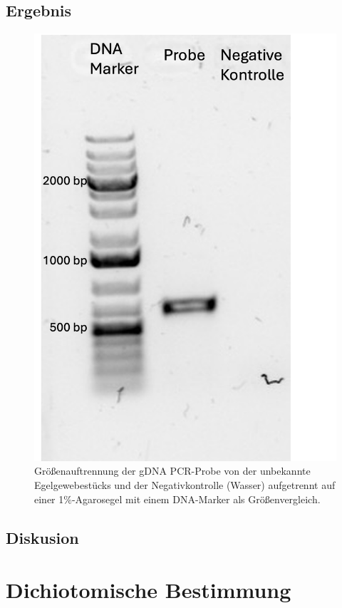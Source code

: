 \documentclass[oneside,10pt,a4paper]{report}
\begin{document}
	\subsection{Ergebnis}
	\begin{figure}[H]
		\centering
		\includegraphics[scale=0.7]{gel.png}
		\caption{Größenauftrennung der gDNA PCR-Probe von der unbekannte Egelgewebestücks und der Negativkontrolle (Wasser) aufgetrennt auf einer 1$\%$-Agarosegel mit einem DNA-Marker als Größenvergleich.}
		\label{fig:Agarosegel}
	\end{figure}
	
	\subsection{Diskusion}
	
	\section{Dichiotomische Bestimmung }
\end{document}
